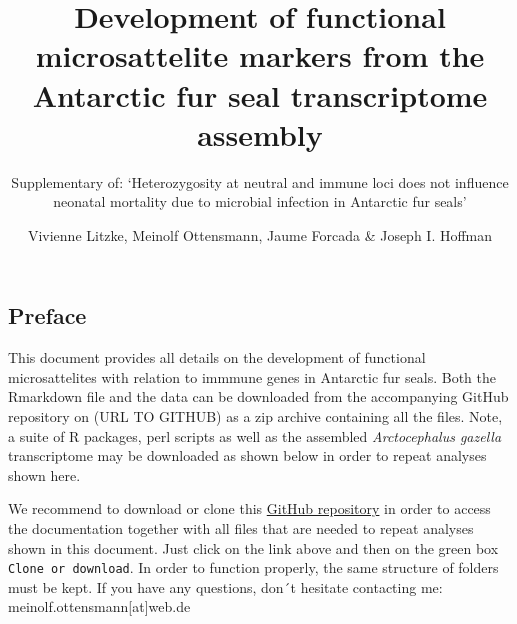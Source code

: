 \documentclass[]{article}
\title{Development of functional microsattelite markers from the Antarctic fur
seal transcriptome assembly}
\subtitle{Supplementary of: `Heterozygosity at neutral and immune loci does not
influence neonatal mortality due to microbial infection in Antarctic fur
seals'}
\author{Vivienne Litzke, Meinolf Ottensmann, Jaume Forcada \& Joseph I. Hoffman}
\date{}
\begin{document}
\maketitle

\subsection{Preface}\label{preface}

This document provides all details on the development of functional
microsattelites with relation to immmune genes in Antarctic fur seals.
Both the Rmarkdown file and the data can be downloaded from the
accompanying GitHub repository on (URL TO GITHUB) as a zip archive
containing all the files. Note, a suite of R packages, perl scripts as
well as the assembled \emph{Arctocephalus gazella} transcriptome may be
downloaded as shown below in order to repeat analyses shown here.

We recommend to download or clone this \href{URL}{GitHub repository} in
order to access the documentation together with all files that are
needed to repeat analyses shown in this document. Just click on the link
above and then on the green box \texttt{Clone\ or\ download}. In order
to function properly, the same structure of folders must be kept. If you
have any questions, don´t hesitate contacting me:
meinolf.ottensmann{[}at{]}web.de
\end{document}
